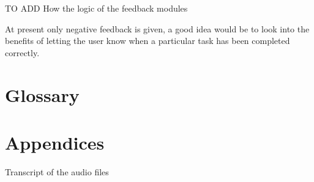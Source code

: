 \documentclass{article}
\begin{document}
\newpage


\newpage


\newpage


\newpage


TO ADD How the logic of the feedback modules

\newpage


\newpage


At present only negative feedback is given, a good idea would be to look into the benefits of letting the user know when a particular task has been completed correctly.

\newpage


\newpage
\section{Glossary}

\newpage
\section{Appendices}
Transcript of the audio files

\newpage
{}

\end{document}
